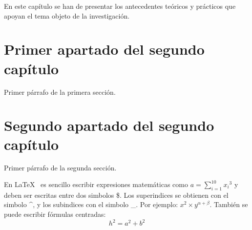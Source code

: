 

En este capítulo se han de presentar los antecedentes teóricos y prácticos que
apoyan el tema objeto de la investigación.


\section{Primer apartado del segundo capítulo}
\label{2:sec:1}
  Primer párrafo de la primera sección.

\section{Segundo apartado del segundo capítulo}
\label{2:sec:2}
  Primer párrafo de la segunda sección.

  En \LaTeX{}~\cite{Lamport:LDP94} es sencillo escribir expresiones
  matemáticas como $a=\sum_{i=1}^{10} {x_i}^{3}$
  y deben ser escritas entre dos simbolos \$.
  Los superindices se obtienen con el simbolo \^{}, y
  los subindices con el simbolo \_.
  Por ejemplo: $x^2 \times y^{\alpha + \beta}$.
  También se puede escribir fórmulas centradas:
  \[h^2=a^2+b^2\]